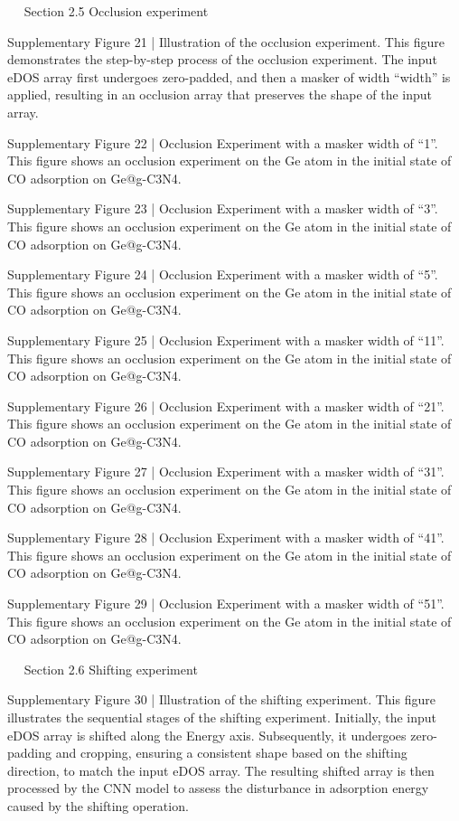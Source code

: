  
Section 2.5 Occlusion experiment


Supplementary Figure 21 | Illustration of the occlusion experiment. This figure demonstrates the step-by-step process of the occlusion experiment. The input eDOS array first undergoes zero-padded, and then a masker of width “width” is applied, resulting in an occlusion array that preserves the shape of the input array.



Supplementary Figure 22 | Occlusion Experiment with a masker width of “1”. This figure shows an occlusion experiment on the Ge atom in the initial state of CO adsorption on Ge@g-C3N4.


Supplementary Figure 23 | Occlusion Experiment with a masker width of “3”. This figure shows an occlusion experiment on the Ge atom in the initial state of CO adsorption on Ge@g-C3N4.



Supplementary Figure 24 | Occlusion Experiment with a masker width of “5”. This figure shows an occlusion experiment on the Ge atom in the initial state of CO adsorption on Ge@g-C3N4.

Supplementary Figure 25 | Occlusion Experiment with a masker width of “11”. This figure shows an occlusion experiment on the Ge atom in the initial state of CO adsorption on Ge@g-C3N4.



Supplementary Figure 26 | Occlusion Experiment with a masker width of “21”. This figure shows an occlusion experiment on the Ge atom in the initial state of CO adsorption on Ge@g-C3N4.

Supplementary Figure 27 | Occlusion Experiment with a masker width of “31”. This figure shows an occlusion experiment on the Ge atom in the initial state of CO adsorption on Ge@g-C3N4.



Supplementary Figure 28 | Occlusion Experiment with a masker width of “41”. This figure shows an occlusion experiment on the Ge atom in the initial state of CO adsorption on Ge@g-C3N4.

Supplementary Figure 29 | Occlusion Experiment with a masker width of “51”. This figure shows an occlusion experiment on the Ge atom in the initial state of CO adsorption on Ge@g-C3N4.


 
Section 2.6 Shifting experiment


Supplementary Figure 30 | Illustration of the shifting experiment. This figure illustrates the sequential stages of the shifting experiment. Initially, the input eDOS array is shifted along the Energy axis. Subsequently, it undergoes zero-padding and cropping, ensuring a consistent shape based on the shifting direction, to match the input eDOS array. The resulting shifted array is then processed by the CNN model to assess the disturbance in adsorption energy caused by the shifting operation.



